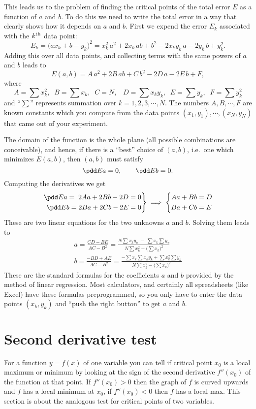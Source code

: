 This leads us to the problem of finding the critical points of the total
error $E$ as a function of $a$ and $b$.  To do this we need to write the
total error in a way that clearly shows how it depends on $a$ and $b$.
First we expend the error $E_k$ associated with the $k^{\rm th}$ data point:
\[
E_k = \bigl(ax_k+b-y_k\bigr)^2
=x_k^2\, a^2 + 2x_k \, ab + b^2 -2x_ky_k\, a - 2 y_k\, b + y_k^2 .
\]
Adding this over all data points, and collecting terms with the same powers
of $a$ and $b$ leads to
\[
E(a,b) = A\,a^2 +2B\, ab + C\, b^2 - 2D\,a -2E\, b +F,
\]
where
\[\textstyle
A = \sum x_k^2,\;\;
B=\sum x_k,\;\;
C=N,\;\;\;
D= \sum x_ky_k,\;\;
E= \sum y_k,\;\;
F= \sum y_k^2
\]
and ``$\sum$'' represents summation over $k=1, 2, 3, \cdots, N$.  The
numbers $A, B, \cdots, F$ are known constants which you compute from
the data points $(x_1,y_1), \cdots, (x_N,y_N)$ that came out of your
experiment.

The domain of the function is the whole plane (all possible
combinations are conceivable), and hence, if there is a ``best'' choice of
$(a,b)$, i.e.\ one which minimizes $E(a,b)$, then $(a,b)$ must satisfy 
\[
\pdd Ea = 0, \qquad \pdd Eb = 0.
\]
Computing the derivatives we get
\[
\left.
\begin{aligned}
    \pdd Ea = \; 2Aa+2Bb-2D =0 &\\
    \pdd Eb = 2Ba +2Cb - 2E =0 &
\end{aligned}
\right\}
\implies
\left\{
\begin{aligned}
    Aa+Bb & =D \\ Ba + Cb &=E
\end{aligned}
\right.
\]
These are two linear equations for the two unknowns $a$ and $b$.
Solving them leads to
\begin{gather}
a = \frac{CD-BE}{AC-B^2}
  = \frac{N\sum x_ky_k \; - \; \sum x_k \sum y_x}
         {N\sum x_k^2 - \bigl(\sum x_k\bigr)^2}\\
b = \frac{-BD+AE}{AC-B^2}
  = \frac{-\sum x_k \sum x_ky_k  + \sum x_k^2 \sum y_k}
         {N\sum x_k^2 - \bigl(\sum x_k\bigr)^2}
\end{gather}
These are the standard formulas for the coefficients $a$ and $b$ provided
by the method of linear regression.  Most calculators, and certainly all
spreadsheets (like Excel) have these formulas preprogrammed, so you only
have to enter the data points $(x_k,y_k)$ and ``push the right button'' to
get $a$ and $b$.




\section{Second derivative test} %
\label{sec:second-deriv-test}
For a function $y=f(x)$ of one variable you can tell if critical point
$x_0$ is a local maximum or minimum by looking at the sign of the second
derivative $f''(x_0)$ of the function at that point.  If $f''(x_0)>0$ then
the graph of $f$ is curved upwards and $f$ has a local minimum at $x_0$, if
$f''(x_0)<0$ then $f$ has a local max.  This section is about the analogous
test for critical points of two variables.



